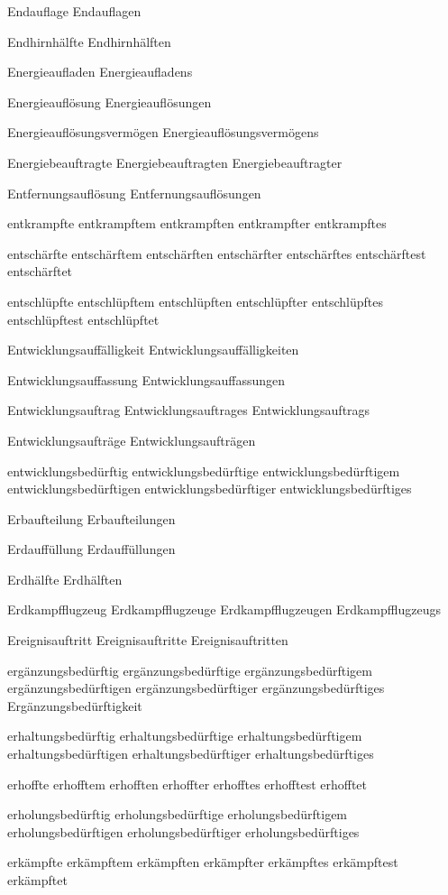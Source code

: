 Endauflage
Endauflagen

Endhirnhälfte
Endhirnhälften

Energieaufladen
Energieaufladens

Energieauflösung
Energieauflösungen

Energieauflösungsvermögen
Energieauflösungsvermögens

Energiebeauftragte
Energiebeauftragten
Energiebeauftragter

Entfernungsauflösung
Entfernungsauflösungen

entkrampfte
entkrampftem
entkrampften
entkrampfter
entkrampftes

entschärfte
entschärftem
entschärften
entschärfter
entschärftes
entschärftest
entschärftet

entschlüpfte
entschlüpftem
entschlüpften
entschlüpfter
entschlüpftes
entschlüpftest
entschlüpftet

Entwicklungsauffälligkeit
Entwicklungsauffälligkeiten

Entwicklungsauffassung
Entwicklungsauffassungen

Entwicklungsauftrag
Entwicklungsauftrages
Entwicklungsauftrags

Entwicklungsaufträge
Entwicklungsaufträgen

entwicklungsbedürftig
entwicklungsbedürftige
entwicklungsbedürftigem
entwicklungsbedürftigen
entwicklungsbedürftiger
entwicklungsbedürftiges

Erbaufteilung
Erbaufteilungen

Erdauffüllung
Erdauffüllungen

Erdhälfte
Erdhälften

Erdkampfflugzeug
Erdkampfflugzeuge
Erdkampfflugzeugen
Erdkampfflugzeugs

Ereignisauftritt
Ereignisauftritte
Ereignisauftritten

ergänzungsbedürftig
ergänzungsbedürftige
ergänzungsbedürftigem
ergänzungsbedürftigen
ergänzungsbedürftiger
ergänzungsbedürftiges
Ergänzungsbedürftigkeit

erhaltungsbedürftig
erhaltungsbedürftige
erhaltungsbedürftigem
erhaltungsbedürftigen
erhaltungsbedürftiger
erhaltungsbedürftiges

erhoffte
erhofftem
erhofften
erhoffter
erhofftes
erhofftest
erhofftet

erholungsbedürftig
erholungsbedürftige
erholungsbedürftigem
erholungsbedürftigen
erholungsbedürftiger
erholungsbedürftiges

erkämpfte
erkämpftem
erkämpften
erkämpfter
erkämpftes
erkämpftest
erkämpftet


